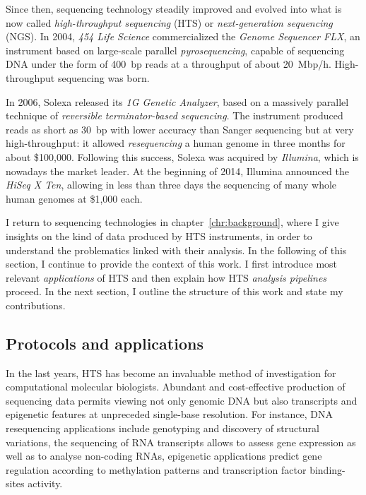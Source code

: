 Since then, sequencing technology steadily improved and evolved into what is now called \emph{high-throughput sequencing} (HTS) or \emph{next-generation sequencing} (NGS).
In 2004, \emph{454 Life Science} commercialized the \emph{Genome Sequencer FLX}, an instrument based on large-scale parallel \emph{pyrosequencing}, capable of sequencing DNA under the form of 400~bp reads at a throughput of about 20~Mbp/h.
High-throughput sequencing was born.

In 2006, Solexa released its \emph{1G Genetic Analyzer}, based on a massively parallel technique of \emph{reversible terminator-based sequencing}.
The instrument produced reads as short as 30~bp with lower accuracy than Sanger sequencing but at very high-throughput: it allowed \emph{resequencing} a human genome in three months for about \$100,000.
Following this success, Solexa was acquired by \emph{Illumina}, which is nowadays the market leader.
At the beginning of 2014, Illumina announced the \emph{HiSeq X Ten}, allowing in less than three days the sequencing of many whole human genomes at \$1,000 each.


I return to sequencing technologies in chapter~\ref{chr:background}, where I give insights on the kind of data produced by HTS instruments, in order to understand the problematics linked with their analysis.
In the following of this section, I continue to provide the context of this work.
I first introduce most relevant \emph{applications} of HTS and then explain how HTS \emph{analysis pipelines} proceed.
In the next section, I outline the structure of this work and state my contributions.

\subsection{Protocols and applications}

In the last years, HTS has become an invaluable method of investigation for computational molecular biologists.
Abundant and cost-effective production of sequencing data permits viewing not only genomic DNA but also transcripts and epigenetic features at unpreceded single-base resolution.
For instance, DNA resequencing applications include genotyping and discovery of structural variations, the sequencing of RNA transcripts allows to assess gene expression as well as to analyse non-coding RNAs, epigenetic applications predict gene regulation according to methylation patterns and transcription factor binding-sites activity.

